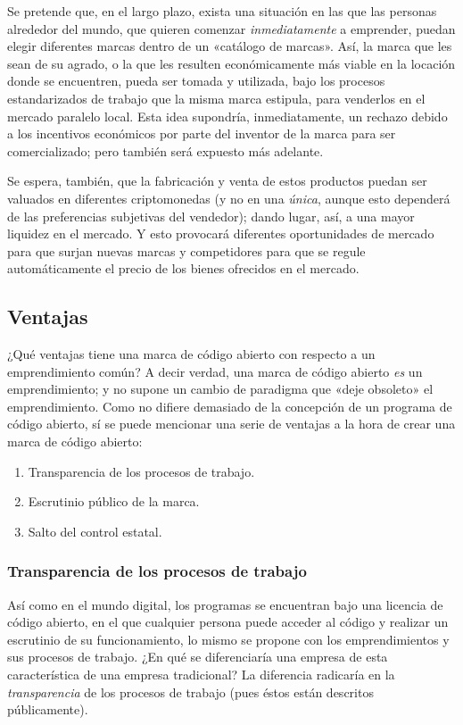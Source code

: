 \documentclass[12pt,a4paper]{article}
\begin{document}
Se pretende que, en el largo plazo, exista una situación en las que las personas alrededor del mundo, que quieren comenzar \textit{inmediatamente} a emprender, puedan elegir diferentes marcas dentro de un «catálogo de marcas». Así, la marca que les sean de su agrado, o la que les resulten económicamente más viable en la locación donde se encuentren, pueda ser tomada y utilizada, bajo los procesos estandarizados de trabajo que la misma marca estipula, para venderlos en el mercado paralelo local. Esta idea supondría, inmediatamente, un rechazo debido a los incentivos económicos por parte del inventor de la marca para ser comercializado; pero también será expuesto más adelante.

Se espera, también, que la fabricación y venta de estos productos puedan ser valuados en diferentes criptomonedas (y no en una \textit{única}, aunque esto dependerá de las preferencias subjetivas del vendedor); dando lugar, así, a una mayor liquidez en el mercado. Y esto provocará diferentes oportunidades de mercado para que surjan nuevas marcas y competidores para que se regule automáticamente el precio de los bienes ofrecidos en el mercado.

\subsection{Ventajas}
¿Qué ventajas tiene una marca de código abierto con respecto a un emprendimiento común? A decir verdad, una marca de código abierto \textit{es} un emprendimiento; y no supone un cambio de paradigma que «deje obsoleto» el emprendimiento. Como no difiere demasiado de la concepción de un programa de código abierto, sí se puede mencionar una serie de ventajas a la hora de crear una marca de código abierto:

\begin{enumerate}
\item Transparencia de los procesos de trabajo.
\item Escrutinio público de la marca.
\item Salto del control estatal.
\end{enumerate}

\subsubsection{Transparencia de los procesos de trabajo}
Así como en el mundo digital, los programas se encuentran bajo una licencia de código abierto, en el que cualquier persona puede acceder al código y realizar un escrutinio de su funcionamiento, lo mismo se propone con los emprendimientos y sus procesos de trabajo. ¿En qué se diferenciaría una empresa de esta característica de una empresa tradicional? La diferencia radicaría en la \textit{transparencia} de los procesos de trabajo (pues éstos están descritos públicamente).
\end{document}
